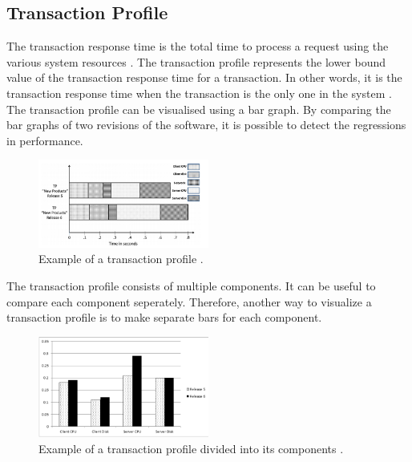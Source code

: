 \subsection{Transaction Profile}
The transaction response time is the total time to process a request using the various system resources \cite{jain2008art}. The transaction profile represents the lower bound value of the transaction response time for a transaction. In other words, it is the transaction response time when the transaction is the only one in the system \cite{ghaith2015anomaly}. The transaction profile can be visualised using a bar graph. By comparing the bar graphs of two revisions of the software, it is possible to detect the regressions in performance.

\begin{figure}[h]
\begin{center}
  \includegraphics[width=0.5\textwidth]{Figures/TP.png}
\end{center}
  \caption{ Example of a transaction profile \cite{ghaith2015anomaly}.}

\end{figure}

The transaction profile consists of multiple components. It can be useful to compare each component seperately. Therefore, another way to visualize a transaction profile is to make separate bars for each component.

\begin{figure}[h]
\begin{center}
  \includegraphics[width=0.5\textwidth]{Figures/TPbars.png}
\end{center}
  \caption{Example of a transaction profile divided into its components \cite{ghaith2015anomaly}.}

\end{figure}
\newpage
